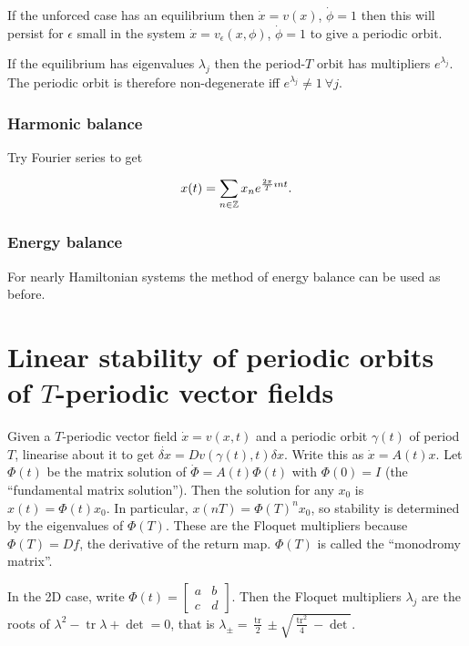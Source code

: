 \documentclass{notes}
\theoremstyle{plain}
\DeclareMathOperator{\tr}{tr}
\begin{document}
If the unforced case has an equilibrium then 
$\dot{x} = v(x)$, $\dot{\phi} = 1$ then this will persist for
$\epsilon$ small in the system $\dot{x} = v_\epsilon(x,\phi)$,
$\dot{\phi} = 1$ to give a periodic orbit.

If the equilibrium has eigenvalues $\lambda_j$ then the period-$T$ orbit
has multipliers $e^{\lambda_j}$.  The periodic orbit is therefore
non-degenerate iff $e^{\lambda_j} \neq 1\ \forall j$.

\subsubsection*{Harmonic balance}

Try Fourier series to get

\[
x(t) = \sum_{n \in \mathbb{Z}} x_n e^{\frac{2 \pi}{T} \imath n t}.
\]

\subsubsection*{Energy balance}

For nearly Hamiltonian systems the method of energy balance can be used
as before.

\section[Linear stability]
{Linear stability of periodic orbits of $T$-periodic vector fields}

Given a $T$-periodic vector field $\dot{x} = v(x,t)$ and a periodic orbit
$\gamma(t)$ of period $T$, linearise about it to get
$\dot{\delta x} = Dv (\gamma(t),t) \delta x$.  Write this as 
$\dot{x} = A(t) x$.  Let $\Phi(t)$ be the matrix solution of
$\dot{\Phi} = A(t) \Phi(t)$ with $\Phi(0) = I$ (the ``fundamental
matrix solution'').  Then the solution for any $x_0$ is
$x(t) = \Phi(t) x_0$.  In particular, $x(n T) = \Phi(T)^n x_0$, so
stability is determined by the eigenvalues of $\Phi(T)$.  These are the
Floquet multipliers because $\Phi(T) = Df$, the derivative of the return map.
$\Phi(T)$ is called the ``monodromy matrix''.

In the 2D case, write $\Phi(t) = \begin{bmatrix} a & b \\ c & d
\end{bmatrix}$.  Then the Floquet multipliers $\lambda_j$ are the roots
of $\lambda^2 - \tr \lambda + \det = 0$, that is
$\lambda_\pm = \frac{\tr}{2} \pm \sqrt{\frac{\tr^2}{4} - \det}$.
\end{document}
